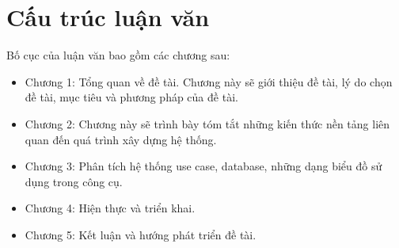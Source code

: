 \section{Cấu trúc luận văn}
Bố cục của luận văn bao gồm các chương sau:
\begin{itemize}
	\item Chương 1: Tổng quan về đề tài. Chương này sẽ giới thiệu đề tài, lý do chọn đề tài, mục tiêu và phương pháp của đề tài.
	\item Chương 2: Chương này sẽ trình bày tóm tắt những kiến thức nền tảng liên quan đến quá trình xây dựng hệ thống.
	\item Chương 3: Phân tích hệ thống use case, database, những dạng biểu đồ sử dụng trong công cụ.
	\item Chương 4: Hiện thực và triển khai.
	\item Chương 5: Kết luận và hướng phát triển đề tài.
\end{itemize}